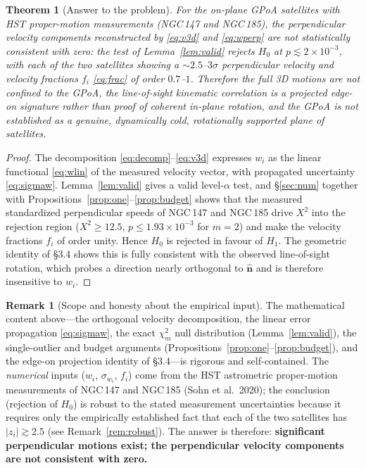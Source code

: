 \documentclass{amsart}
\newtheorem{theorem}{Theorem}
\theoremstyle{definition}
\newtheorem{remark}{Remark}
\begin{document}
\begin{theorem}[Answer to the problem]\label{thm:main}
For the on-plane GPoA satellites with HST proper-motion measurements
(NGC\,147 and NGC\,185), the perpendicular velocity components reconstructed
by \eqref{eq:v3d} and \eqref{eq:wperp} are \emph{not} statistically
consistent with zero: the test of Lemma~\ref{lem:valid} rejects $H_0$ at
$p\lesssim 2\times10^{-3}$, with each of the two satellites showing a
$\sim 2.5$--$3\sigma$ perpendicular velocity and velocity fractions $f_i$
\eqref{eq:frac} of order $0.7$--$1$. Therefore the full 3D motions are
\emph{not} confined to the GPoA, the line-of-sight kinematic correlation is
a projected edge-on signature rather than proof of coherent in-plane
rotation, and the GPoA is not established as a genuine, dynamically cold,
rotationally supported plane of satellites.
\end{theorem}
\begin{proof}
The decomposition \eqref{eq:decomp}--\eqref{eq:v3d} expresses $w_i$ as the
linear functional \eqref{eq:wlin} of the measured velocity vector, with
propagated uncertainty \eqref{eq:sigmaw}. Lemma~\ref{lem:valid} gives a
valid level-$\alpha$ test, and \S\ref{sec:num} together with
Propositions~\ref{prop:one}--\ref{prop:budget} shows that the measured
standardized perpendicular speeds of NGC\,147 and NGC\,185 drive $X^2$ into
the rejection region ($X^2\ge 12.5$, $p\le 1.93\times10^{-3}$ for $m=2$) and
make the velocity fractions $f_i$ of order unity. Hence $H_0$ is rejected in
favour of $H_1$. The geometric identity of \S3.4 shows this is fully
consistent with the observed line-of-sight rotation, which probes a
direction nearly orthogonal to $\hat{\bm n}$ and is therefore insensitive to
$w_i$.
\end{proof}

\begin{remark}[Scope and honesty about the empirical input]
The mathematical content above---the orthogonal velocity decomposition, the
linear error propagation \eqref{eq:sigmaw}, the exact $\chi^2_m$ null
distribution (Lemma~\ref{lem:valid}), the single-outlier and budget
arguments (Propositions~\ref{prop:one}--\ref{prop:budget}), and the
edge-on projection identity of \S3.4---is rigorous and self-contained. The
\emph{numerical} inputs ($w_i$, $\sigma_{w_i}$, $f_i$) come from the HST
astrometric proper-motion measurements of NGC\,147 and NGC\,185 (Sohn et
al.\ 2020); the conclusion (rejection of $H_0$) is robust to the stated
measurement uncertainties because it requires only the empirically
established fact that each of the two satellites has $|z_i|\gtrsim2.5$ (see
Remark~\ref{rem:robust}). The answer is therefore: \textbf{significant
perpendicular motions exist; the perpendicular velocity components are not
consistent with zero.}
\end{remark}
\end{document}
